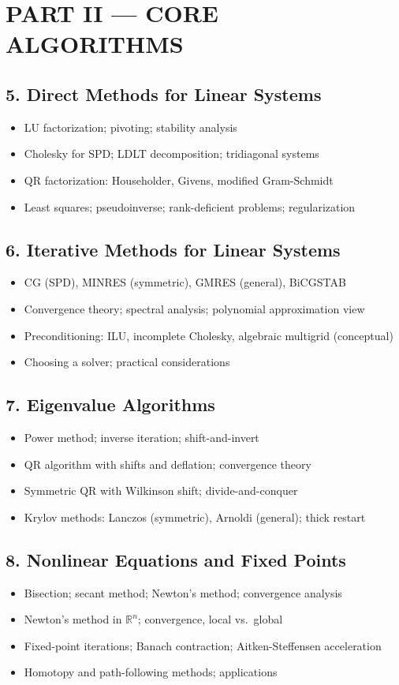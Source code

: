 \section{PART II --- CORE ALGORITHMS}

\subsection{5. Direct Methods for Linear Systems}
\begin{itemize}
\item LU factorization; pivoting; stability analysis
\item Cholesky for SPD; LDLT decomposition; tridiagonal systems
\item QR factorization: Householder, Givens, modified Gram-Schmidt
\item Least squares; pseudoinverse; rank-deficient problems; regularization
\end{itemize}

\subsection{6. Iterative Methods for Linear Systems}
\begin{itemize}
\item CG (SPD), MINRES (symmetric), GMRES (general), BiCGSTAB
\item Convergence theory; spectral analysis; polynomial approximation view
\item Preconditioning: ILU, incomplete Cholesky, algebraic multigrid (conceptual)
\item Choosing a solver; practical considerations
\end{itemize}

\subsection{7. Eigenvalue Algorithms}
\begin{itemize}
\item Power method; inverse iteration; shift-and-invert
\item QR algorithm with shifts and deflation; convergence theory
\item Symmetric QR with Wilkinson shift; divide-and-conquer
\item Krylov methods: Lanczos (symmetric), Arnoldi (general); thick restart
\end{itemize}

\subsection{8. Nonlinear Equations and Fixed Points}
\begin{itemize}
\item Bisection; secant method; Newton's method; convergence analysis
\item Newton's method in $\mathbb{R}^n$; convergence, local vs.\ global
\item Fixed-point iterations; Banach contraction; Aitken-Steffensen acceleration
\item Homotopy and path-following methods; applications
\end{itemize}

